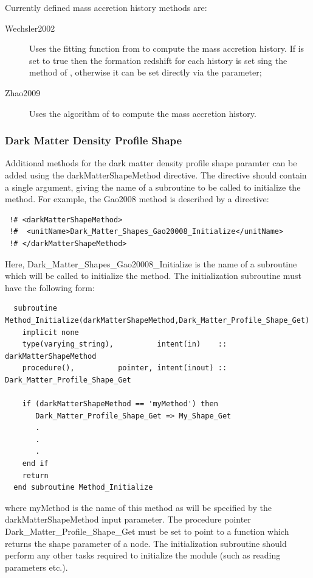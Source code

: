 Currently defined mass accretion history methods are:
\begin{description}
 \item [{\normalfont \ttfamily Wechsler2002}] Uses the fitting function from \cite{wechsler_concentrations_2002} to compute the mass accretion history. If {\normalfont \ttfamily [accretionHistoryWechslerFormationRedshiftCompute]} is set to true then the formation redshift for each history is set sing the method of \cite{bullock_profiles_2001}, otherwise it can be set directly via the {\normalfont \ttfamily [accretionHistoryWechslerFormationRedshift]} parameter;
 \item [{\normalfont \ttfamily Zhao2009}] Uses the algorithm of \cite{zhao_accurate_2009} to compute the mass accretion history.
\end{description}

\subsubsection{Dark Matter Density Profile Shape}\label{sec:darkMatterProfileShape}

Additional methods for the dark matter density profile shape paramter can be added using the {\normalfont \ttfamily darkMatterShapeMethod} directive. The directive should contain a single argument, giving the name of a subroutine to be called to initialize the method. For example, the {\normalfont \ttfamily Gao2008} method is described by a directive:
\begin{verbatim}
 !# <darkMatterShapeMethod>
 !#  <unitName>Dark_Matter_Shapes_Gao20008_Initialize</unitName>
 !# </darkMatterShapeMethod>
\end{verbatim}
Here, {\normalfont \ttfamily Dark\_Matter\_Shapes\_Gao20008\_Initialize} is the name of a subroutine which will be called to initialize the method. The initialization subroutine must have the following form:
\begin{verbatim}
  subroutine Method_Initialize(darkMatterShapeMethod,Dark_Matter_Profile_Shape_Get)
    implicit none
    type(varying_string),          intent(in)    :: darkMatterShapeMethod
    procedure(),          pointer, intent(inout) :: Dark_Matter_Profile_Shape_Get
    
    if (darkMatterShapeMethod == 'myMethod') then
       Dark_Matter_Profile_Shape_Get => My_Shape_Get
       .
       .
       .
    end if
    return
  end subroutine Method_Initialize
\end{verbatim}
where {\normalfont \ttfamily myMethod} is the name of this method as will be specified by the {\normalfont \ttfamily darkMatterShapeMethod} input parameter. The procedure pointer {\normalfont \ttfamily Dark\_Matter\_Profile\_Shape\_Get} must be set to point to a function which returns the shape parameter of a node. The initialization subroutine should perform any other tasks required to initialize the module (such as reading parameters etc.).


